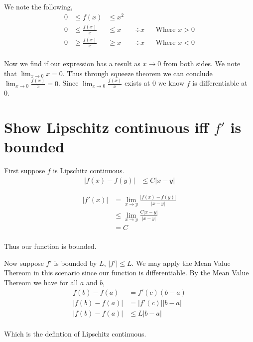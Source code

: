 \documentclass{article}
\begin{document}
We note the following,
\begin{align*}
    0 &\leq f(x) &\leq x^2 \\
    0 &\leq \frac{f(x)}{x} &\leq x && \div x && \text{Where $x > 0$} \\
    0 &\geq \frac{f(x)}{x} &\geq x && \div x && \text{Where $x < 0$} \\
\end{align*}

Now we find if our expression has a result as $x \to 0$ from both sides.
We note that $\lim_{x \to 0} x = 0$. Thus through squeeze theorem we can
conclude $\lim_{x \to 0} \frac{f(x)}{x} = 0$.
Since $\lim_{x \to 0} \frac{f(x)}{x}$ exists at 0 we know $f$ is
differentiable at 0.

\section{Show Lipschitz continuous iff $f'$ is bounded}
First suppose $f$ is Lipschitz continuous.
\begin{align*}
    |f(x) - f(y)| &\leq C|x - y|
\end{align*}

\begin{align*}
    |f'(x)| &= \lim_{x \to y} \frac{|f(x) - f(y)|}{|x - y|} \\
    &\leq \lim_{x \to y} \frac{C|x - y|}{|x - y|} \\
    &= C \\
\end{align*}

Thus our function is bounded.

Now suppose $f'$ is bounded by $L$, $|f'| \leq L$.
We may apply the Mean Value Thereom in this scenario since our function is
differentiable. By the Mean Value Thereom we have for all $a$ and $b$,
\begin{align*}
    f(b) - f(a) &= f'(c)(b - a) \\
    |f(b) - f(a)| &= |f'(c)||b - a| \\
    |f(b) - f(a)| &\leq L|b - a| \\
\end{align*}

Which is the defintion of Lipschitz continuous.
\end{document}
